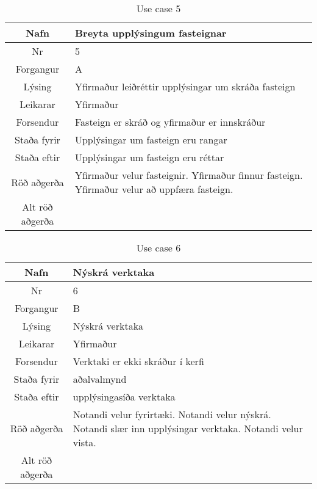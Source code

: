\begin{table}[h!]\centering
\begin{tabular}{|c|p{10cm}|}
\hline
Nafn&Breyta upplýsingum fasteignar\\
\hline
Nr&5\\
\hline
Forgangur&A\\
\hline
Lýsing&Yfirmaður leiðréttir upplýsingar um skráða fasteign\\
\hline
Leikarar&Yfirmaður\\
\hline
Forsendur&Fasteign er skráð og yfirmaður er innskráður\\
\hline
Staða fyrir&Upplýsingar um fasteign eru rangar\\
\hline
Staða eftir&Upplýsingar um fasteign eru réttar\\
\hline
Röð aðgerða&Yfirmaður velur fasteignir. Yfirmaður finnur fasteign. Yfirmaður velur að uppfæra fasteign.\\
\hline
Alt röð aðgerða&\\
\hline
\end{tabular}
\caption{Use case 5}\label{tab:use_case_5}
\end{table}
\begin{table}[h!]\centering
\begin{tabular}{|c|p{10cm}|}
\hline
Nafn&Nýskrá verktaka \\
\hline
Nr&6\\
\hline
Forgangur&B\\
\hline
Lýsing&Nýskrá verktaka \\
\hline
Leikarar&Yfirmaður\\
\hline
Forsendur&Verktaki er ekki skráður í kerfi\\
\hline
Staða fyrir&aðalvalmynd\\
\hline
Staða eftir&upplýsingasíða verktaka\\
\hline
Röð aðgerða&Notandi velur fyrirtæki. Notandi velur nýskrá. Notandi slær inn upplýsingar verktaka. Notandi velur vista.\\
\hline
Alt röð aðgerða&\\
\hline
\end{tabular}
\caption{Use case 6}\label{tab:use_case_6}
\end{table}
